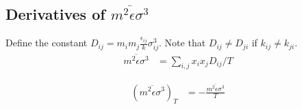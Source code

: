 \documentclass[english]{../thermomemo/thermomemo}
\newcommand{\z}{\zeta}
\begin{document}





\subsection{Derivatives of $\overline{m^2\epsilon \sigma^3}$}
Define the constant $D_{ij} = m_i m_j \frac{\epsilon_{ij}}{k} \sigma_{ij}^3$. Note that
$D_{ij} \neq D_{ji}$ if $k_{ij} \neq k_{ji}$.
\begin{align}
  \overline{m^2\epsilon \sigma^3} &= \sum_{i,j} x_i x_j D_{ij}/T
\end{align}

\begin{align}
  (\overline{m^2\epsilon \sigma^3})_T &=  -\frac{\overline{m^2\epsilon \sigma^3}}{T}
\end{align}
\end{document}
